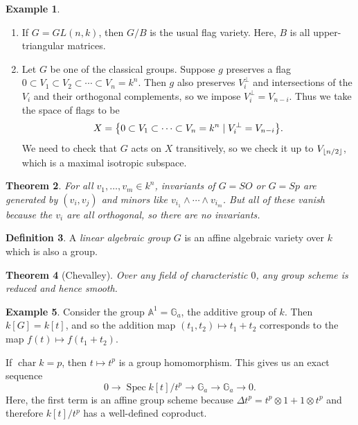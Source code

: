 \documentclass[leqno, openany]{memoir}
\DeclarePairedDelimiter{\floor}{\lfloor}{\rfloor}
\newtheorem{thm}{Theorem}[section]
\theoremstyle{definition}
\newtheorem{defn}[thm]{Definition}
\newtheorem{exm}[thm]{Example}
\theoremstyle{remark}
\theoremstyle{plain}
\theoremstyle{definition}
\theoremstyle{remark}
\newcommand{\A}{\mathbb{A}}
\DeclareMathOperator{\Spec}{Spec}
\begin{document}
\begin{exm} \begin{enumerate} \item If $G = GL(n, k)$, then $G/B$ is the usual
    flag variety. Here, $B$ is all upper-triangular matrices.  \item Let $G$ be
    one of the classical groups. Suppose $g$ preserves a flag $0 \subset V_1
    \subset V_2 \subset \cdots \subset V_n = k^n$. Then $g$ also preserves
    $V_i^{\perp}$ and intersections of the $V_i$ and their orthogonal
    complements, so we impose $V_i^{\perp} = V_{n-i}$. Thus we take the space
    of flags to be \[ X = \qty{0 \subset V_1 \subset \cdots \subset V_n = k^n
    \mid V_i^{\perp} = V_{n-i}}. \] We need to check that $G$ acts on $X$
    transitively, so we check it up to $V_{\floor{n/2}}$, which is a maximal
    isotropic subspace.  \end{enumerate} \end{exm}

\begin{thm} For all $v_1, \ldots, v_m \in k^n$, invariants of $G = SO$ or $G =
    Sp$ are generated by $(v_i, v_j)$ and minors like $v_{i_1} \wedge \cdots
    \wedge v_{i_m}$. But all of these vanish because the $v_i$ are all
    orthogonal, so there are no invariants.  \end{thm}

\begin{defn} A \textit{linear algebraic group} $G$ is an affine algebraic
variety over $k$ which is also a group.  \end{defn}

\begin{thm}[Chevalley] Over any field of characteristic $0$, any group scheme
is reduced and hence smooth.  \end{thm}

\begin{exm} Consider the group $\A^1 = \mathbb{G}_a$, the additive group of
    $k$. Then $k[G] = k[t]$, and so the addition map $(t_1, t_2) \mapsto t_1 +
    t_2$ corresponds to the map $f(t) \mapsto f(t_1 + t_2)$.

    If $\operatorname{char} k = p$, then $t \mapsto t^p$ is a group
    homomorphism. This gives us an exact sequence \[ 0 \to \Spec k[t]/t^p \to
    \mathbb{G}_a \to \mathbb{G}_a \to 0. \] Here, the first term is an affine
    group scheme because $\Delta t^p = t^p \otimes 1 + 1 \otimes t^p$ and
    therefore $k[t] / t^p$ has a well-defined coproduct.  \end{exm}
\end{document}
